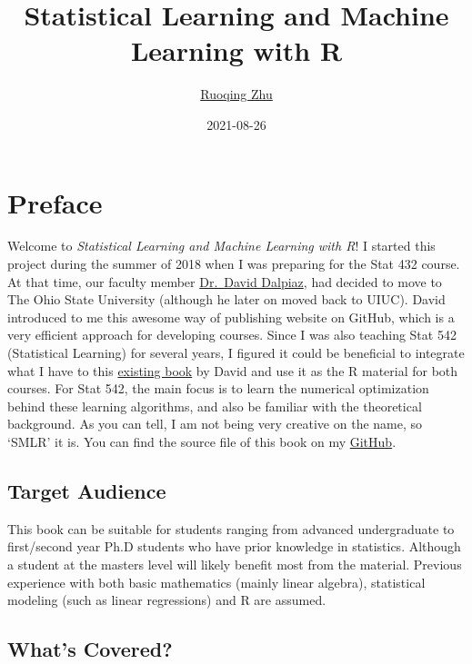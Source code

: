 \documentclass[
]{book}
\title{Statistical Learning and Machine Learning with R}
\author{\href{https://sites.google.com/site/teazrq/}{Ruoqing Zhu}}
\date{2021-08-26}
\begin{document}
\maketitle

{
\hypersetup{linkcolor=}
\setcounter{tocdepth}{1}
\tableofcontents
}
\hypertarget{preface}{%
\chapter*{Preface}\label{preface}}

Welcome to \emph{Statistical Learning and Machine Learning with R}! I started this project during the summer of 2018 when I was preparing for the Stat 432 course. At that time, our faculty member \href{https://daviddalpiaz.com/teaching.html}{Dr.~David Dalpiaz}, had decided to move to The Ohio State University (although he later on moved back to UIUC). David introduced to me this awesome way of publishing website on GitHub, which is a very efficient approach for developing courses. Since I was also teaching Stat 542 (Statistical Learning) for several years, I figured it could be beneficial to integrate what I have to this \href{https://daviddalpiaz.github.io/r4sl/}{existing book} by David and use it as the R material for both courses. For Stat 542, the main focus is to learn the numerical optimization behind these learning algorithms, and also be familiar with the theoretical background. As you can tell, I am not being very creative on the name, so `SMLR' it is. You can find the source file of this book on my \href{https://teazrq.github.io/SMLR/}{GitHub}.

\hypertarget{target-audience}{%
\section*{Target Audience}\label{target-audience}}

This book can be suitable for students ranging from advanced undergraduate to first/second year Ph.D students who have prior knowledge in statistics. Although a student at the masters level will likely benefit most from the material. Previous experience with both basic mathematics (mainly linear algebra), statistical modeling (such as linear regressions) and R are assumed.

\hypertarget{whats-covered}{%
\section*{What's Covered?}\label{whats-covered}}
\end{document}
